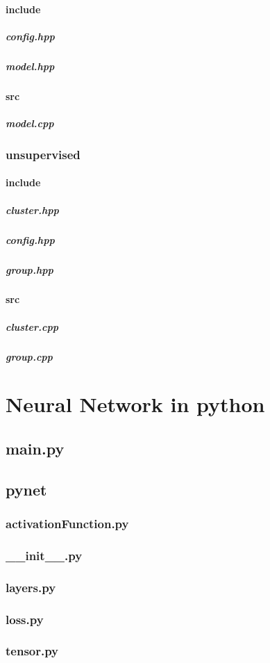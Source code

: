 \documentclass[12pt]{article}
\newcommand{\incDemo}[2]{\label{demo:#2}\newpage}
\newcommand{\incNN}[2]{\label{demo:#2}\newpage}
\begin{document}
\paragraph{include}														%
\subparagraph{config.hpp}											\incDemo{c++}{supervised/include/config.hpp}
\subparagraph{model.hpp}											\incDemo{c++}{supervised/include/model.hpp}
\paragraph{src}																%
\subparagraph{model.cpp}												\incDemo{c++}{supervised/src/model.cpp}
\subsubsection{unsupervised}										%
\paragraph{include}														%
\subparagraph{cluster.hpp}											\incDemo{c++}{unsupervised/include/cluster.hpp}
\subparagraph{config.hpp}											\incDemo{c++}{unsupervised/include/config.hpp}
\subparagraph{group.hpp}												\incDemo{c++}{unsupervised/include/group.hpp}
\paragraph{src}																%
\subparagraph{cluster.cpp}											\incDemo{c++}{unsupervised/src/cluster.cpp}
\subparagraph{group.cpp}												\incDemo{c++}{unsupervised/src/group.cpp}

\section{Neural Network in python}
\subsection{main.py}														\incNN{python}{main.py}
\subsection{pynet}															%
\subsubsection{activationFunction.py}							\incNN{python}{pynet/activationFunction.py}
\subsubsection{\_\_init\_\_.py}											\incNN{python}{pynet/__init__.py}
\subsubsection{layers.py}												\incNN{python}{pynet/layers.py}
\subsubsection{loss.py}													\incNN{python}{pynet/loss.py}
\subsubsection{tensor.py}												\incNN{python}{pynet/tensor.py}
\end{document}
